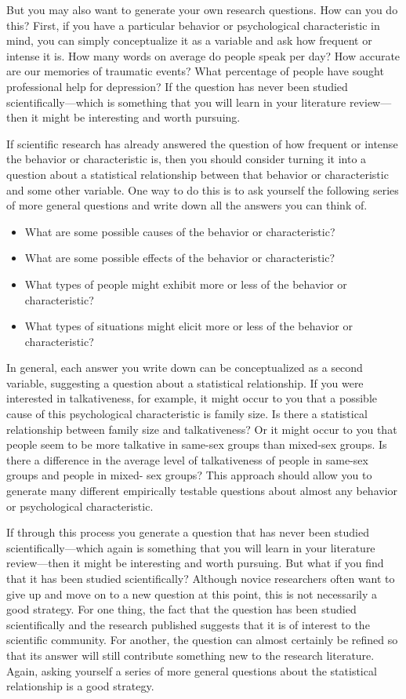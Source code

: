 But you may also want to generate your own research questions. How can you do this? First, if you have a particular behavior or psychological characteristic in mind, you can simply conceptualize it as a variable and ask how frequent or intense it is. How many words on average do people speak per day? How accurate are our memories of traumatic events? What percentage of people have sought professional help for depression? If the question has never been studied scientifically---which is something that you will learn in your literature review---then it might be interesting and worth pursuing.

If scientific research has already answered the question of how frequent or intense the behavior or characteristic is, then you should consider turning it into a question about a statistical relationship between that behavior or characteristic and some other variable. One way to do this is to ask yourself the following series of more general questions and write down all the answers you can think of.

\begin{itemize}
\item What are some possible causes of the behavior or characteristic?
\item What are some possible effects of the behavior or characteristic?
\item What types of people might exhibit more or less of the behavior or characteristic?
\item What types of situations might elicit more or less of the behavior or characteristic?
\end{itemize}


In general, each answer you write down can be conceptualized as a second variable, suggesting a question about a statistical relationship. If you were interested in talkativeness, for example, it might occur to you that a possible cause of this psychological characteristic is family size. Is there a statistical relationship between family size and talkativeness? Or it might occur to you that people seem to be more talkative in same-sex groups than mixed-sex groups. Is there a difference in the average level of talkativeness of people in same-sex groups and people in mixed- sex groups? This approach should allow you to generate many different empirically testable questions about almost any behavior or psychological characteristic.

If through this process you generate a question that has never been studied scientifically---which again is something that you will learn in your literature review---then it might be interesting and worth pursuing. But what if you find that it has been studied scientifically? Although novice researchers often want to give up and move on to a new question at this point, this is not necessarily a good strategy. For one thing, the fact that the question has been studied scientifically and the research published suggests that it is of interest to the scientific community. For another, the question can almost certainly be refined so that its answer will still contribute something new to the research literature. Again, asking yourself a series of more general questions about the statistical relationship is a good strategy.

